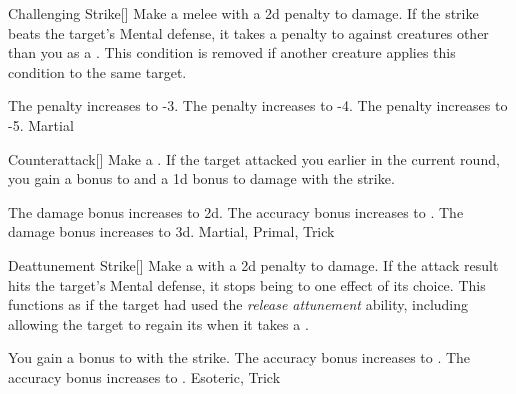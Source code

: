 \lowercase{\hypertarget{maneuver:Challenging Strike}{}}\label{maneuver:Challenging Strike}
\hypertarget{maneuver:Challenging Strike}{}
\begin{freeability}[Rank 1]{Challenging Strike}[]
Make a melee  with a \minus2d penalty to damage.
If the strike beats the target's Mental defense, it takes a  penalty to  against creatures other than you as a .
This condition is removed if another creature applies this condition to the same target.

\rankline
{} The penalty increases to -3.
 The penalty increases to -4.
 The penalty increases to -5.
 Martial
\end{freeability}
\vspace{0.25em}



\lowercase{\hypertarget{maneuver:Counterattack}{}}\label{maneuver:Counterattack}
\hypertarget{maneuver:Counterattack}{}
\begin{freeability}[Rank 1]{Counterattack}[]
Make a .
If the target attacked you earlier in the current round, you gain a  bonus to  and a \plus1d bonus to damage with the strike.

\rankline
{} The damage bonus increases to \plus2d.
 The accuracy bonus increases to .
 The damage bonus increases to \plus3d.
 Martial, Primal, Trick
\end{freeability}
\vspace{0.25em}



\lowercase{\hypertarget{maneuver:Deattunement Strike}{}}\label{maneuver:Deattunement Strike}
\hypertarget{maneuver:Deattunement Strike}{}
\begin{freeability}[Rank 1]{Deattunement Strike}[]
Make a  with a \minus2d penalty to damage.
If the attack result hits the target's Mental defense,
it stops being  to one effect of its choice.
This functions as if the target had used the \textit{release attunement} ability,
including allowing the target to regain its  when it takes a .

\rankline
{} You gain a  bonus to  with the strike.
 The accuracy bonus increases to .
 The accuracy bonus increases to .
 Esoteric, Trick
\end{freeability}
\vspace{0.25em}



